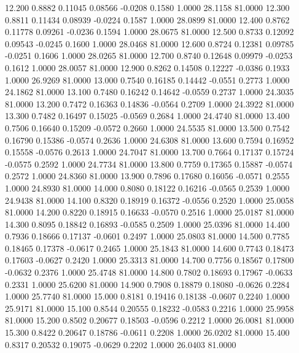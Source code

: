   12.200   0.8882   0.11045   0.08566  -0.0208   0.1580   1.0000  28.1158  81.0000
  12.300   0.8811   0.11434   0.08939  -0.0224   0.1587   1.0000  28.0899  81.0000
  12.400   0.8762   0.11778   0.09261  -0.0236   0.1594   1.0000  28.0675  81.0000
  12.500   0.8733   0.12092   0.09543  -0.0245   0.1600   1.0000  28.0468  81.0000
  12.600   0.8724   0.12381   0.09785  -0.0251   0.1606   1.0000  28.0265  81.0000
  12.700   0.8740   0.12648   0.09979  -0.0253   0.1612   1.0000  28.0057  81.0000
  12.900   0.8262   0.14508   0.12227  -0.0386   0.1933   1.0000  26.9269  81.0000
  13.000   0.7540   0.16185   0.14442  -0.0551   0.2773   1.0000  24.1862  81.0000
  13.100   0.7480   0.16242   0.14642  -0.0559   0.2737   1.0000  24.3035  81.0000
  13.200   0.7472   0.16363   0.14836  -0.0564   0.2709   1.0000  24.3922  81.0000
  13.300   0.7482   0.16497   0.15025  -0.0569   0.2684   1.0000  24.4740  81.0000
  13.400   0.7506   0.16640   0.15209  -0.0572   0.2660   1.0000  24.5535  81.0000
  13.500   0.7542   0.16790   0.15386  -0.0574   0.2636   1.0000  24.6308  81.0000
  13.600   0.7594   0.16952   0.15558  -0.0576   0.2613   1.0000  24.7047  81.0000
  13.700   0.7664   0.17137   0.15724  -0.0575   0.2592   1.0000  24.7734  81.0000
  13.800   0.7759   0.17365   0.15887  -0.0574   0.2572   1.0000  24.8360  81.0000
  13.900   0.7896   0.17680   0.16056  -0.0571   0.2555   1.0000  24.8930  81.0000
  14.000   0.8080   0.18122   0.16216  -0.0565   0.2539   1.0000  24.9438  81.0000
  14.100   0.8320   0.18919   0.16372  -0.0556   0.2520   1.0000  25.0058  81.0000
  14.200   0.8220   0.18915   0.16633  -0.0570   0.2516   1.0000  25.0187  81.0000
  14.300   0.8095   0.18842   0.16893  -0.0585   0.2509   1.0000  25.0396  81.0000
  14.400   0.7936   0.18666   0.17137  -0.0601   0.2497   1.0000  25.0803  81.0000
  14.500   0.7785   0.18465   0.17378  -0.0617   0.2465   1.0000  25.1843  81.0000
  14.600   0.7743   0.18473   0.17603  -0.0627   0.2420   1.0000  25.3313  81.0000
  14.700   0.7756   0.18567   0.17800  -0.0632   0.2376   1.0000  25.4748  81.0000
  14.800   0.7802   0.18693   0.17967  -0.0633   0.2331   1.0000  25.6200  81.0000
  14.900   0.7908   0.18879   0.18080  -0.0626   0.2284   1.0000  25.7740  81.0000
  15.000   0.8181   0.19416   0.18138  -0.0607   0.2240   1.0000  25.9171  81.0000
  15.100   0.8544   0.20555   0.18232  -0.0583   0.2216   1.0000  25.9958  81.0000
  15.200   0.8502   0.20677   0.18503  -0.0596   0.2212   1.0000  26.0081  81.0000
  15.300   0.8422   0.20647   0.18786  -0.0611   0.2208   1.0000  26.0202  81.0000
  15.400   0.8317   0.20532   0.19075  -0.0629   0.2202   1.0000  26.0403  81.0000
